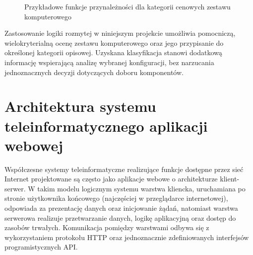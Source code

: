 \documentclass[a4paper,twoside,12pt]{book}
\begin{document}
\begin{figure}[H]
\centering
{}
\caption{Przykładowe funkcje przynależności dla kategorii cenowych zestawu komputerowego}
\label{fig:fuzzy_cena}
\end{figure}
Zastosowanie logiki rozmytej w niniejszym projekcie umożliwia
pomocniczą, wielokryterialną ocenę zestawu komputerowego
oraz jego przypisanie do określonej kategorii opisowej.
Uzyskana klasyfikacja stanowi dodatkową informację wspierającą
analizę wybranej konfiguracji, bez narzucania jednoznacznych
decyzji dotyczących doboru komponentów.



\section{Architektura systemu teleinformatycznego aplikacji webowej}
Współczesne systemy teleinformatyczne realizujące funkcje dostępne przez sieć Internet
projektowane są często jako aplikacje webowe o architekturze klient-serwer.
W takim modelu logicznym systemu warstwa kliencka, uruchamiana po stronie użytkownika
końcowego (najczęściej w przeglądarce internetowej), odpowiada za prezentację danych
oraz inicjowanie żądań, natomiast warstwa serwerowa realizuje przetwarzanie danych,
logikę aplikacyjną oraz dostęp do zasobów trwałych.
Komunikacja pomiędzy warstwami odbywa się z wykorzystaniem protokołu HTTP
oraz jednoznacznie zdefiniowanych interfejsów programistycznych API.
\end{document}

